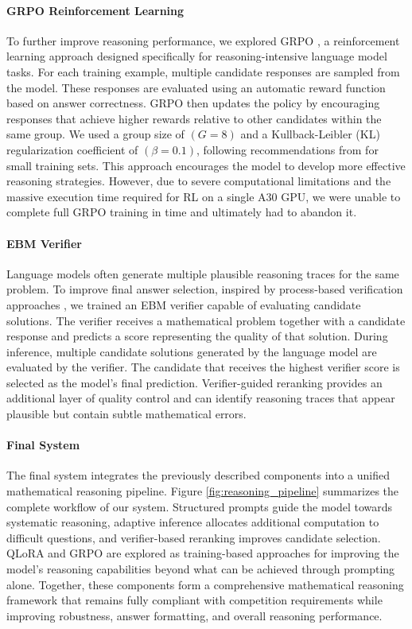 \documentclass{article}
\begin{document}
\paragraph{GRPO Reinforcement Learning} To further improve reasoning performance, we explored GRPO \cite{shao2024grpo}, a reinforcement learning approach designed specifically for reasoning-intensive language model tasks. For each training example, multiple candidate responses are sampled from the model. These responses are evaluated using an automatic reward function based on answer correctness. GRPO then updates the policy by encouraging responses that achieve higher rewards relative to other candidates within the same group. We used a group size of $(G = 8)$ and a Kullback-Leibler (KL) regularization coefficient of $(\beta = 0.1)$, following recommendations from \citet{drgrpo2025} for small training sets. This approach encourages the model to develop more effective reasoning strategies. However, due to severe computational limitations and the massive execution time required for RL on a single A30 GPU, we were unable to complete full GRPO training in time and ultimately had to abandon it.

\paragraph{EBM Verifier} Language models often generate multiple plausible reasoning traces for the same problem. To improve final answer selection, inspired by process-based verification approaches \cite{lightman2023verify}, we trained an EBM verifier capable of evaluating candidate solutions. The verifier receives a mathematical problem together with a candidate response and predicts a score representing the quality of that solution. During inference, multiple candidate solutions generated by the language model are evaluated by the verifier. The candidate that receives the highest verifier score is selected as the model's final prediction. Verifier-guided reranking provides an additional layer of quality control and can identify reasoning traces that appear plausible but contain subtle mathematical errors.

\paragraph{Final System} The final system integrates the previously described components into a unified mathematical reasoning pipeline. Figure \ref{fig:reasoning_pipeline} summarizes the complete workflow of our system. Structured prompts guide the model towards systematic reasoning, adaptive inference allocates additional computation to difficult questions, and verifier-based reranking improves candidate selection. QLoRA and GRPO are explored as training-based approaches for improving the model's reasoning capabilities beyond what can be achieved through prompting alone. Together, these components form a comprehensive mathematical reasoning framework that remains fully compliant with competition requirements while improving robustness, answer formatting, and overall reasoning performance.
\end{document}
